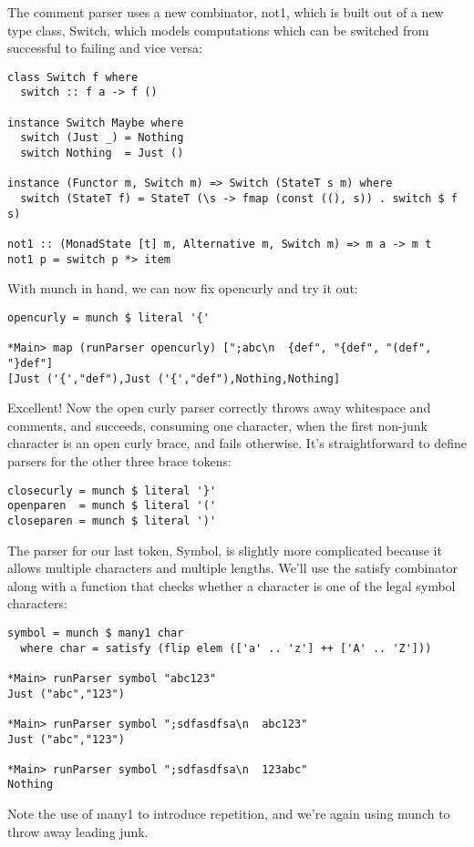 \documentclass{tmr}
\begin{document}
The comment parser uses a new combinator, not1, which is built out of a new
type class, Switch, which models computations which can be switched from
successful to failing and vice versa:
\begin{verbatim}
class Switch f where
  switch :: f a -> f ()

instance Switch Maybe where
  switch (Just _) = Nothing
  switch Nothing  = Just ()

instance (Functor m, Switch m) => Switch (StateT s m) where
  switch (StateT f) = StateT (\s -> fmap (const ((), s)) . switch $ f s)

not1 :: (MonadState [t] m, Alternative m, Switch m) => m a -> m t
not1 p = switch p *> item
\end{verbatim}

With munch in hand, we can now fix opencurly and try it out:
\begin{verbatim}
opencurly = munch $ literal '{'

*Main> map (runParser opencurly) [";abc\n  {def", "{def", "(def", "}def"]
[Just ('{',"def"),Just ('{',"def"),Nothing,Nothing]
\end{verbatim}
Excellent!  Now the open curly parser correctly throws away whitespace and comments,
and succeeds, consuming one character, when the first non-junk character is an open 
curly brace, and fails otherwise.
It's straightforward to define parsers for the other three brace tokens:
\begin{verbatim}
closecurly = munch $ literal '}'
openparen  = munch $ literal '('
closeparen = munch $ literal ')'
\end{verbatim}

The parser for our last token, Symbol, is slightly more complicated because it allows
multiple characters and multiple lengths.  We'll use the satisfy combinator along with 
a function that checks whether a character is one of the legal symbol characters:
\begin{verbatim}
symbol = munch $ many1 char
  where char = satisfy (flip elem (['a' .. 'z'] ++ ['A' .. 'Z']))

*Main> runParser symbol "abc123"
Just ("abc","123")

*Main> runParser symbol ";sdfasdfsa\n  abc123"
Just ("abc","123")

*Main> runParser symbol ";sdfasdfsa\n  123abc"
Nothing
\end{verbatim}
Note the use of many1 to introduce repetition,
and we're again using munch to throw away leading junk.
\end{document}
